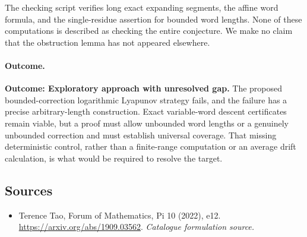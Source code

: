 \documentclass[11pt,a4paper]{article}
\numberwithin{equation}{section}
\begin{document}
The checking script verifies long exact expanding segments, the affine word formula, and the single-residue assertion for bounded word lengths. None of these computations is described as checking the entire conjecture. We make no claim that the obstruction lemma has not appeared elsewhere.

\paragraph{Outcome.}
\textbf{Outcome: Exploratory approach with unresolved gap.}
The proposed bounded-correction logarithmic Lyapunov strategy fails, and the failure has a precise arbitrary-length construction. Exact variable-word descent certificates remain viable, but a proof must allow unbounded word lengths or a genuinely unbounded correction and must establish universal coverage. That missing deterministic control, rather than a finite-range computation or an average drift calculation, is what would be required to resolve the target.

\subsection{Sources}
\begin{itemize}\raggedright
\item[\textnormal{[S1]}]\hypertarget{source:188:1}{} Terence Tao, Forum of Mathematics, Pi 10 (2022), e12.
\url{https://arxiv.org/abs/1909.03562}.
{\small\textit{Catalogue formulation source.}}
\end{itemize}
\end{document}
